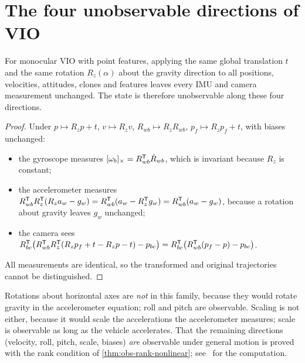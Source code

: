 \section{The four unobservable directions of VIO}

\begin{theorem}
\label{thm:vio-unobservable}
For monocular VIO with point features, applying the same global translation $t$ and the same rotation $R_z(\alpha)$ about the
gravity direction to all positions, velocities, attitudes, clones and features leaves every IMU and camera measurement
unchanged. The state is therefore unobservable along these four directions.
\end{theorem}
\begin{proof}
Under $p \mapsto R_zp + t$, $v \mapsto R_zv$, $R_{wb} \mapsto R_zR_{wb}$, $p_f \mapsto R_zp_f + t$, with biases unchanged:
\begin{itemize}
  \item the gyroscope measures $[\omega_b]_{\times} = R_{wb}^{\mathsf{T}}\dot R_{wb}$, which is invariant because $R_z$ is constant;
  \item the accelerometer measures $R_{wb}^{\mathsf{T}} R_z^{\mathsf{T}}(R_za_w - g_w) = R_{wb}^{\mathsf{T}}(a_w - R_z^{\mathsf{T}} g_w) = R_{wb}^{\mathsf{T}}(a_w - g_w)$, because a rotation about
        gravity leaves $g_w$ unchanged;
  \item the camera sees $R_{bc}^{\mathsf{T}}\big(R_{wb}^{\mathsf{T}} R_z^{\mathsf{T}}(R_zp_f + t - R_zp - t) - p_{bc}\big) = R_{bc}^{\mathsf{T}}\big(R_{wb}^{\mathsf{T}}(p_f - p) - p_{bc}\big)$.
\end{itemize}
All measurements are identical, so the transformed and original trajectories cannot be distinguished.
\end{proof}

Rotations about horizontal axes are \emph{not} in this family, because they would rotate gravity in the accelerometer equation;
roll and pitch are observable. Scaling is not either, because it would scale the accelerations the accelerometer measures;
scale is observable as long as the vehicle accelerates. That the remaining directions (velocity, roll, pitch, scale, biases) \emph{are}
observable under general motion is proved with the rank condition of \cref{thm:obs-rank-nonlinear}; see~\cite{hesch2014consistency} for the
computation.

